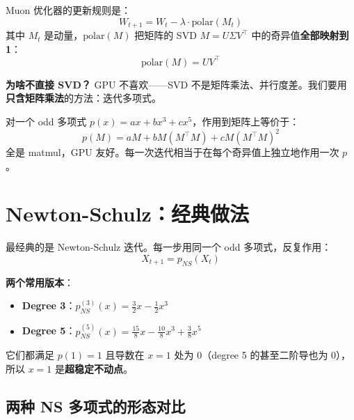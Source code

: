 \documentclass[11pt]{article}
\begin{document}
Muon 优化器的更新规则是：
\[
W_{t+1} = W_t - \lambda \cdot \mathrm{polar}(M_t)
\]
其中 $M_t$ 是动量，$\mathrm{polar}(M)$ 把矩阵的 SVD $M = U\Sigma V^\top$ 中的奇异值\textbf{全部映射到 1}：
\[
\mathrm{polar}(M) = U V^\top
\]

\begin{center}
\end{center}

\textbf{为啥不直接 SVD？} GPU 不喜欢——SVD 不是矩阵乘法、并行度差。我们要用\textbf{只含矩阵乘法}的方法：迭代多项式。

对一个 odd 多项式 $p(x) = ax + bx^3 + cx^5$，作用到矩阵上等价于：
\[
p(M) = a M + b M(M^\top M) + c M(M^\top M)^2
\]
全是 matmul，GPU 友好。每一次迭代相当于在每个奇异值上独立地作用一次 $p$。

\section{Newton-Schulz：经典做法}

最经典的是 Newton-Schulz 迭代。每一步用同一个 odd 多项式，反复作用：
\[
X_{t+1} = p_{NS}(X_t)
\]

\textbf{两个常用版本}：
\begin{itemize}
\item \textbf{Degree 3}：$p_{NS}^{(3)}(x) = \frac{3}{2} x - \frac{1}{2} x^3$
\item \textbf{Degree 5}：$p_{NS}^{(5)}(x) = \frac{15}{8} x - \frac{10}{8} x^3 + \frac{3}{8} x^5$
\end{itemize}

它们都满足 $p(1) = 1$ 且导数在 $x = 1$ 处为 0（degree 5 的甚至二阶导也为 0），所以 $x = 1$ 是\textbf{超稳定不动点}。

\subsection{两种 NS 多项式的形态对比}
\end{document}
